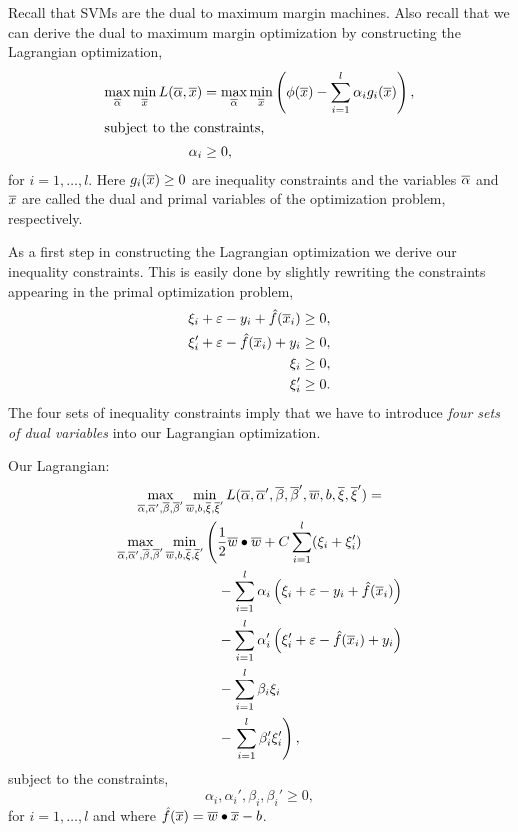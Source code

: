 \documentclass[a4paper,blends,pdf,colorBG,slideColor]{prosper}
\begin{document}
Recall that SVMs are the dual to maximum margin machines.  
Also recall that we can derive the dual to maximum margin
optimization by constructing the Lagrangian optimization,
\begin{align*}
\max_{\overline{\alpha}} \min_{\overline{x}} L(\overline{\alpha},\overline{x}) &= \max_{\overline{\alpha}} \min_{\overline{x}} \left (\phi(\overline{x}) - \sum_{i=1}^l \alpha_i g_i(\overline{x})\right),\\
\intertext{subject to the constraints,}
\alpha_i &\ge 0,
\end{align*}
for $i = 1,\ldots,l$.
Here $g_i(\overline{x}) \geq 0$ are inequality constraints and the variables $\overline{\alpha}$ and $\overline{x}$
are called the dual and primal variables of the optimization problem, respectively.

\es


As a first step in constructing the Lagrangian optimization we derive our inequality constraints.
This is easily done by slightly rewriting the constraints appearing in the primal optimization problem,
\begin{align*}
\xi_i + \varepsilon- y_i + \hat{f}(\overline{x}_i)  &\geq 0,\\
\xi_i' + \varepsilon - \hat{f}(\overline{x}_i)  + y_i  &\geq 0, \\
\xi_i &\geq 0, \\
\xi_i' &\geq 0.
\end{align*}
The four sets of inequality constraints imply that we have to introduce {\em four sets of dual variables} into our
Lagrangian optimization.
\es

\small
Our Lagrangian:
\begin{multline*}
\max_{\overline{\alpha},\overline{\alpha}',\overline{\beta},\overline{\beta}'}
\min_{\overline{w},b,\overline{\xi},\overline{\xi}'} 
L(\overline{\alpha},\overline{\alpha}',\overline{\beta},\overline{\beta}',\overline{w},b,\overline{\xi},\overline{\xi}') =\\
\begin{aligned}
\max_{\overline{\alpha},\overline{\alpha}',\overline{\beta},\overline{\beta}'}
\min_{\overline{w},b,\overline{\xi},\overline{\xi}'} 
	&\left ( \frac{1}{2}\overline{w}\bullet\overline{w} +
	C \sum_{i = 1}^l ( \xi_i + \xi_i') \right . \\
&\quad -	\sum_{i = 1}^l \alpha_i \left(\xi_i + \varepsilon- y_i + \hat{f}(\overline{x}_i)\right)  \\
&\quad -	\sum_{i = 1}^l \alpha_i'\left(\xi_i' + \varepsilon - \hat{f}(\overline{x}_i)  + y_i \right)  \\
&\quad -	\sum_{i = 1}^l \beta_i \xi_i \\
&\quad -	\left . \sum_{i = 1}^l \beta_i' \xi_i' \right ),
\end{aligned}
\end{multline*}
subject to the constraints,
\begin{equation*}
\alpha_i,\alpha_i',\beta_i,\beta_i' \ge 0,
\end{equation*}
for $i = 1,\ldots,l$ and where $\hat{f}(\overline{x}) =  \overline{w}\bullet\overline{x} - b$.
\es
\end{document}
